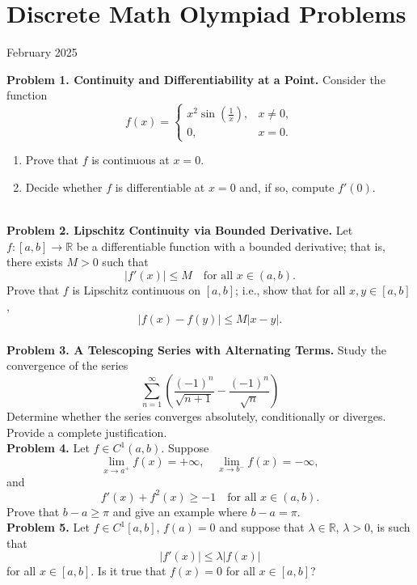 \documentclass{article}
\begin{document}
\pagestyle{plain}

\section*{Discrete Math Olympiad Problems}

\begin{center}
February 2025
\end{center}

\textbf{Problem 1. Continuity and Differentiability at a Point.}
Consider the function
\[
f(x) = \begin{cases}
x^2 \sin\left(\frac{1}{x}\right), & x\neq 0, \\
0, & x=0.
\end{cases}
\]
\begin{enumerate}
    \item Prove that \(f\) is continuous at \(x=0\).
    \item Decide whether \(f\) is differentiable at \(x=0\) and, if so, compute \(f'(0)\).
\end{enumerate}
\\

\textbf{Problem 2. Lipschitz Continuity via Bounded Derivative.}
Let \(f:[a,b]\to \mathbb{R}\) be a differentiable function with a bounded derivative; that is, there exists \(M>0\) such that
\[
    |f'(x)| \le M \quad \text{for all } x \in (a,b).
\]
Prove that \(f\) is Lipschitz continuous on \([a,b]\); i.e., show that for all \(x,y\in [a,b]\),
\[
    |f(x)-f(y)| \le M |x-y|.
\]
\\

\textbf{Problem 3. A Telescoping Series with Alternating Terms.}
Study the convergence of the series
    \[
    \sum_{n=1}^\infty \left( \frac{(-1)^n}{\sqrt{n+1}} - \frac{(-1)^n}{\sqrt{n}} \right)
    \]
Determine whether the series converges absolutely, conditionally or diverges.
Provide a complete justification.
\\

\textbf{Problem 4.}
Let $f \in C^1(a,b)$. Suppose
\[
\lim_{x \to a^+} f(x) = +\infty,
\quad
\lim_{x \to b^-} f(x) = -\infty,
\]
and
\[
  f'(x) + f^2(x) \ge -1
\quad
\text{for all } x \in (a,b).
\]
Prove that $b-a \geq \pi$ and give an example where $b-a = \pi$.
\\

\textbf{Problem 5.}
Let \( f \in C^1[a,b] \), \( f(a) = 0 \) and suppose that \( \lambda \in \mathbb{R} \), \( \lambda > 0 \), is such that
\[
|f'(x)| \leq \lambda |f(x)|
\]
for all \( x \in [a,b] \). Is it true that \( f(x) = 0 \) for all \( x \in [a,b] \)?
\\
\end{document}

